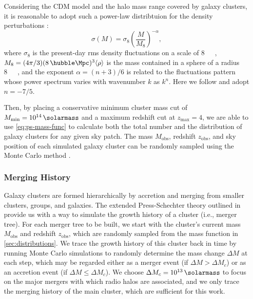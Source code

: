 \documentclass[modern]{aastex62}
\newcommand{\R}[1]{\mathrm{#1}}
\begin{document}
Considering the CDM model and the halo mass range covered by galaxy
clusters, it is reasonable to adopt such a power-law distribtuion
for the density perturbations \citep{sarazin2002,randall2002}:
\begin{equation}
  \label{eq:sigma-mass}
  \sigma(M) = \sigma_8 \left( \frac{M}{M_8} \right)^{-\alpha},
\end{equation}
where $\sigma_8$ is the present-day rms density fluctuations on a
scale of \SI{8}{\per\hubble\Mpc},
$M_8 = (4\pi/3)(8 \,\si{\per\hubble\Mpc})^3 \langle{\rho}\rangle$
is the mass contained in a sphere of a radius \SI{8}{\per\hubble\Mpc},
and the exponent $\alpha = (n+3)/6$ is related to the fluctuations
pattern whose power spectrum varies with wavenumber $k$ as $k^n$.
Here we follow \citet{randall2002} and adopt $n = -7/5$.

Then, by placing a conservative minimum cluster mass cut of
$M_{\R{min}} = \SI{e14}{\solarmass}$ and a maximum redshift cut
at $z_{\R{max}} = 4$, we are able to use \autoref{eq:ps-mass-func}
to calculate both the total number and the distribution of galaxy
clusters for any given sky patch.
The mass $M_{\R{obs}}$, redshift $z_{\R{obs}}$, and sky position of
each simulated galaxy cluster can be randomly sampled using the
Monte Carlo method \citep{wang2010}.


\subsubsection{Merging History}
\label{sec:merging-history}

Galaxy clusters are formed hierarchically by accretion and merging from
smaller clusters, groups, and galaxies.
The extended Press-Schechter theory outlined in \citet{lacey1993} provide
us with a way to simulate the growth history of a cluster (i.e., merger tree).
For each merger tree to be built, we start with the cluster's current
mass $M_{\R{obs}}$ and redshift $z_{\R{obs}}$, which are randomly sampled
from the mass function in \autoref{sec:distributions}.
We trace the growth history of this cluster back in time by running
Monte Carlo simulations to randomly determine the mass change
$\Delta M$ at each step, which may be regarded
either as a merger event (if $\Delta M > \Delta M_c$)
or as an accretion event (if $\Delta M \leq \Delta M_c$).
We choose $\Delta M_c = \SI{e13}{\solarmass}$ to focus on the major mergers
with which radio halos are associated,
and we only trace the merging history of the main cluster,
which are sufficient for this work.
\end{document}
